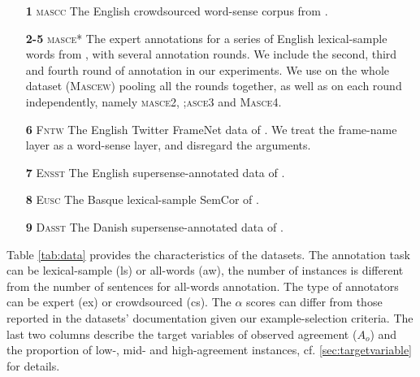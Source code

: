 \documentclass[11pt,a4paper]{article}
\begin{document}
\begin{itemize}[nolistsep,noitemsep]
\item[\textbf{1}] \textsc{mascc} The English crowdsourced word-sense corpus from .
\item[\textbf{2-5}] \textsc{masce*} The expert annotations for a series of English lexical-sample words from , with several annotation rounds. We include the second, third and fourth round of annotation in our experiments. We use on the whole dataset (\textsc{Mascew}) pooling all the rounds together, as well as on each round independently, namely \textsc{masce2}, \textsc{;asce3} and \textsc{Masce4}.
\item[\textbf{6}] \textsc{Fntw} The English Twitter FrameNet data of . We treat the frame-name layer as a word-sense layer, and disregard the arguments.
\item[\textbf{7}] \textsc{Ensst} The English supersense-annotated data of .
\item[\textbf{8}] \textsc{Eusc} The Basque lexical-sample SemCor of .
\item[\textbf{9}] \textsc{Dasst} The Danish supersense-annotated  data of .
\end{itemize}
Table \ref{tab:data} provides the characteristics of the datasets. The annotation task can be lexical-sample (ls) or all-words (aw), the number of instances is different from the number of sentences for all-words annotation. The type of annotators can be expert (ex) or crowdsourced (cs). The $\alpha$ scores can differ from those reported in the datasets' documentation given our example-selection criteria. The last two columns describe the target variables of observed agreement ($A_o$) and the proportion of low-, mid- and high-agreement instances, cf. \ref{sec:targetvariable} for details.
\end{document}
